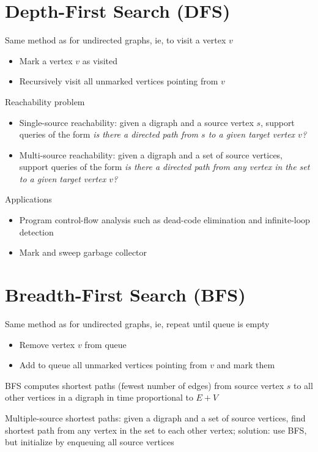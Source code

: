\documentclass[8pt,a4paper,compress]{beamer}
\begin{document}
\section{Depth-First Search (DFS)}
\begin{frame}[fragile]
\pause

Same method as for undirected graphs, ie, to visit a vertex $v$
\begin{itemize}
\item Mark a vertex $v$ as visited

\item Recursively visit all unmarked vertices pointing from $v$
\end{itemize}

\pause
\bigskip

Reachability problem
\begin{itemize}
\item Single-source reachability: given a digraph and a source vertex $s$, support queries of the form \emph{is there a directed path from $s$ to a given target vertex $v$?}

\item Multi-source reachability: given a digraph and a set of source vertices, support queries of the form \emph{is there a directed path from any vertex in the set to a given target vertex $v$?}
\end{itemize}

\pause
\bigskip

Applications
\begin{itemize}
\item Program control-flow analysis such as dead-code elimination and  infinite-loop detection

\item Mark and sweep garbage collector
\end{itemize}
\end{frame}

\section{Breadth-First Search (BFS)}
\begin{frame}[fragile]
\pause

Same method as for undirected graphs, ie, repeat until queue is empty
\begin{itemize}
\item Remove vertex $v$ from queue

\item Add to queue all unmarked vertices pointing from $v$ and mark them
\end{itemize}

\pause
\bigskip

BFS computes shortest paths (fewest number of edges)
from source vertex $s$ to all other vertices in a digraph in time proportional to $E + V$

\pause
\bigskip

Multiple-source shortest paths: given a digraph and a set of source vertices, find shortest path from any vertex in the set to each other vertex; solution: use BFS, but initialize by enqueuing all source vertices
\end{frame}
\end{document}

